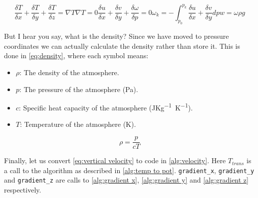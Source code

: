 \begin{subequations}
    \begin{equation}
        \frac{\delta T}{\delta x} + \frac{\delta T}{ \delta y} + \frac{\delta T}{\delta z} = \nabla T
        \label{eq:velocity}
    \end{equation}
    \begin{equation}
        \nabla T = 0
        \label{eq:vel eq}
    \end{equation}
    \begin{equation}
        \frac{\delta u}{\delta x} + \frac{\delta v}{\delta y} + \frac{\delta\omega}{\delta p} = 0
        \label{eq:velocity int}
    \end{equation}
    \begin{equation}
        \omega_k = -\int^{p_k}_{p_0}\frac{\delta u}{\delta x} + \frac{\delta v}{\delta y} dp
        \label{eq:vert vel}
    \end{equation}
    \begin{equation}
        w = \omega \rho g
        \label{eq:vertical velocity}
    \end{equation}
\end{subequations}

But I hear you say, what is the density? Since we have moved to pressure coordinates we can actually calculate the density rather than store it. This is done in \autoref{eq:density}, where each 
symbol means:

\begin{itemize}
    \item $\rho$: The density of the atmosphere.
    \item $p$: The pressure of the atmosphere (\si{Pa}).
    \item $c$: Specific heat capacity of the atmosphere (\si{JKg^{-1}K^{-1}}).
    \item $T$: Temperature of the atmosphere (\si{K}).
\end{itemize}

\begin{equation}
    \rho = \frac{p}{cT}
    \label{eq:density}
\end{equation}

Finally, let us convert \autoref{eq:vertical velocity} to code in \autoref{alg:velocity}. Here $T_{trans}$ is a call to the algorithm as described in \autoref{alg:temp to pot}. 
\texttt{gradient\_x}, \texttt{gradient\_y} and \texttt{gradient\_z} are calls to \autoref{alg:gradient x}, \autoref{alg:gradient y} and \autoref{alg:gradient z} respectively.

